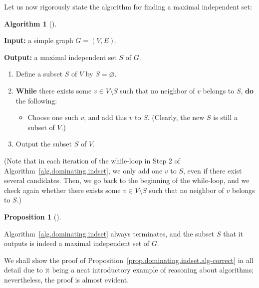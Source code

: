 \documentclass[numbers=enddot,12pt,final,onecolumn,notitlepage]{scrartcl}%
\theoremstyle{definition}
\newtheorem{prop}[theo]{Proposition}
\newenvironment{proposition}[1][]
{\begin{prop}[#1]\begin{leftbar}}
{\end{leftbar}\end{prop}}
\newtheorem{alg}[theo]{Algorithm}
\newenvironment{algorithm}[1][]
{\begin{alg}[#1]\begin{leftbar}}
{\end{leftbar}\end{alg}}
\newcommand{\tup}[1]{\left( #1 \right)}
\begin{document}
Let us now rigorously state the algorithm for finding a maximal
independent set:

\begin{algorithm} \label{alg.dominating.indset}
\textbf{Input:} a simple graph $G = \tup{V, E}$.

\textbf{Output:} a maximal independent set $S$ of $G$.

\begin{enumerate}
\item Define a subset $S$ of $V$ by $S = \varnothing$.
\item \textbf{While} there exists some $v \in V \setminus S$ such that
      no neighbor of $v$ belongs to $S$,
      \textbf{do} the following:
      \begin{itemize}
      \item Choose one such $v$, and add this $v$ to $S$. (Clearly,
      the new $S$ is still a subset of $V$.)
      \end{itemize}
\item Output the subset $S$ of $V$.
\end{enumerate}
\end{algorithm}

(Note that in each iteration of the while-loop in Step 2 of
Algorithm~\ref{alg.dominating.indset}, we only add one $v$ to $S$,
even if there exist several candidates. Then, we go back to the
beginning of the while-loop, and we check again whether there exists
some $v \in V \setminus S$ such that no neighbor of $v$ belongs to
$S$.)

\begin{proposition} \label{prop.dominating.indset.alg-correct}
Algorithm~\ref{alg.dominating.indset} always terminates, and the
subset $S$ that it outputs is indeed a maximal independent set of $G$.
\end{proposition}

We shall show the proof of
Proposition~\ref{prop.dominating.indset.alg-correct} in all detail
due to it being a neat introductory example of reasoning about
algorithms; nevertheless, the proof is almost evident.
\end{document}

